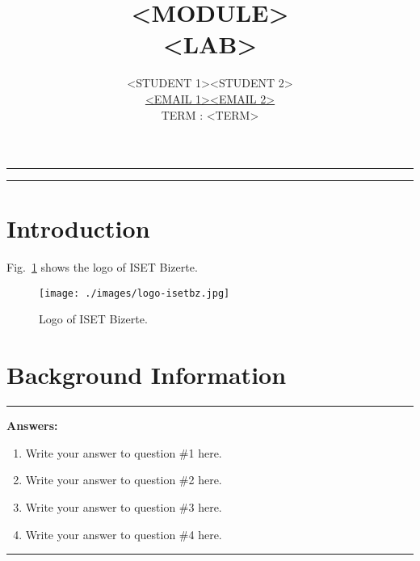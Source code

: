 \documentclass[a4paper]{acmsiggraph}
\title{<MODULE>\\ \LARGE {<LAB>}}
\author{\Large \begin{tabular}{ccc} <STUDENT 1> && <STUDENT 2> \\
\href{mailto:<EMAIL 1>}{<EMAIL 1>} && \href{mailto:<EMAIL 2>}{<EMAIL 2>} \\ & TERM : {\scshape <TERM>} &\\ \end{tabular} }
\newenvironment{answer}{}{}
\begin{document}
\maketitle

\hrule
\setcounter{tocdepth}{2}
\tableofcontents
\vspace{0.25cm}
\hrule

\nocite{*}

\vspace{0.5cm}

%
 
\section{Introduction}
\lipsum[1]

Fig.~\ref{fig:isetbz} shows the logo of ISET Bizerte.

 \begin{figure}[!tbh]
 	\centering
 	\texttt{[image: ./images/logo-isetbz.jpg]}
 	\caption{Logo of ISET Bizerte.}
 	\label{fig:isetbz}
 \end{figure}

\section{Background Information}
\lipsum[1]

\begin{answer}
    \rule{\textwidth}{0.4pt}
    \textbf{Answers:}
    \begin{enumerate}[label=(\roman*)]
        \item Write your answer to question \#1 here.
        \item Write your answer to question \#2 here.
        \item Write your answer to question \#3 here.
        \item Write your answer to question \#4 here.
    \end{enumerate}
    \rule{\textwidth}{0.4pt}
\end{answer}
\end{document}
